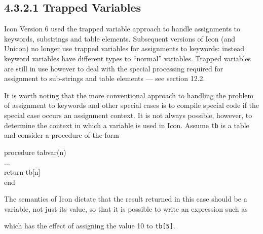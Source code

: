 \subsection[4.3.2.1 Trapped Variables]{4.3.2.1 Trapped Variables}

Icon Version 6 used the trapped variable approach to handle assignments to
keywords, substrings and table elements. Subsequent versions of Icon (and
Unicon) no longer use trapped variables for assignments to keywords:
instead keyword variables have different types to ``normal''
variables. Trapped variables are still in use however to deal with the
special processing required for assignment to sub-strings and table
elements --- see section 12.2.



It is worth noting that the more conventional approach to handling the
problem of assignment to keywords and other special cases is to compile
special code if the special case occurs an assignment context. It is not
always possible, however, to determine the context in which a variable is
used in Icon. Assume \texttt{tb} is a table and consider a procedure of the form

\begin{iconcode}
\>procedure tabvar(n)\\
\> ...\\
\>return tb[n]\\
\>end
\end{iconcode}

The semantics of Icon dictate that the result returned in this case
should be a variable, not just its value, so that it is possible to
write an expression such as


\noindent
which has the effect of assigning the value 10 to \texttt{tb[5]}.

